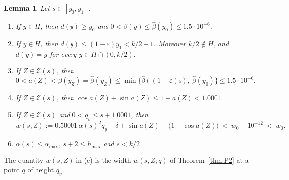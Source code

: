 \documentclass[11pt]{amsart}
\newcommand{\eps}{\varepsilon}
\newcommand{\cZ}{\mathcal Z}
\newcommand{\amax}{\alpha_{\max}}
\newcommand{\hmax}{h_{\max}}
\newtheorem{lemma}[theorem]{Lemma}
\theoremstyle{definition}
\theoremstyle{remark}
\numberwithin{equation}{section}
\begin{document}
\begin{lemma}\label{lem:P7-params}
Let $s\in[y_0,y_1]$.
\begin{enumerate}[label=(\alph*)]
\item If $y\in H$, then $d(y)\ge y_0$ and $0<\beta(y)\le\hat\beta(y_0)\le1.5\cdot10^{-6}$.
\item If $y\in H$, then $d(y)\le(1-\eps)y_1<k/2-1$. Moreover $k/2\notin H$, and $d(y)=y$ for every $y\in H\cap(0,k/2)$.
\item If $Z\in\cZ(s)$, then
\[
0<a(Z)<\beta(y_Z)=\hat\beta(y_Z)\le\min\big\{\hat\beta((1-\eps)s),\ \hat\beta(y_0)\big\}\le1.5\cdot10^{-6}.
\]
\item If $Z\in\cZ(s)$, then $\cos a(Z)+\sin a(Z)\le1+a(Z)<1.0001$.
\item If $Z\in\cZ(s)$ and $0<q_y\le s+1.0001$, then
\[
w(s,Z):=0.50001\,\alpha(s)^2q_y+\delta+\sin a(Z)+\big(1-\cos a(Z)\big)\ <\ w_0-10^{-12}\ <\ w_0 .
\]
\item $\alpha(s)\le\amax$, $s+2\le\hmax$ and $s<k/2$.
\end{enumerate}
\end{lemma}

The quantity $w(s,Z)$ in (e) is the width $w(s,Z;q)$ of Theorem~\ref{thm:P2} at a point $q$ of height $q_y$.
\end{document}
